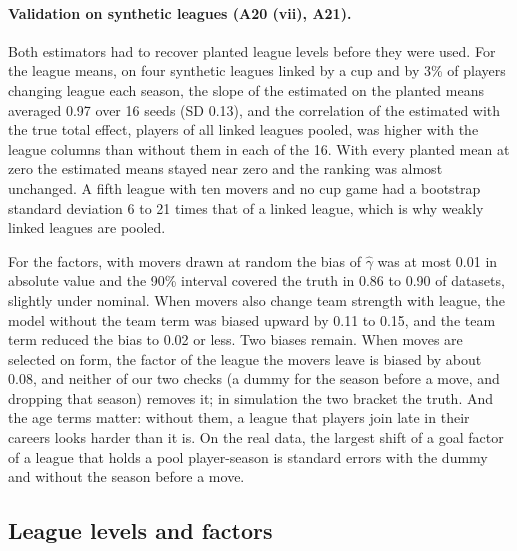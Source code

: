 \documentclass[11pt,a4paper]{article}
\begin{document}
\paragraph{Validation on synthetic leagues (A20 (vii), A21).}
Both estimators had to recover planted league levels before they were used.
For the league means, on four synthetic leagues linked by a cup and by 3\% of
players changing league each season, the slope of the estimated on the planted
means averaged 0.97 over 16 seeds (SD 0.13), and the correlation of the
estimated with the true total effect, players of all linked leagues pooled,
was higher with the league columns than without them in each of the 16. With
every planted mean at zero the estimated means stayed near zero and the
ranking was almost unchanged. A fifth league with ten movers and no cup game had a
bootstrap standard deviation 6 to 21 times that of a linked league, which is
why weakly linked leagues are pooled.

For the factors, with movers drawn at random the bias of $\hat\gamma$ was at
most 0.01 in absolute value and the 90\% interval covered the truth in 0.86 to
0.90 of datasets, slightly under nominal. When movers also change team
strength with league, the model without the team term was biased upward by
0.11 to 0.15, and the team term reduced the bias to 0.02 or less. Two biases
remain. When moves are selected on form, the factor of the league the movers
leave is biased by about 0.08, and neither of our two checks (a dummy for the
season before a move, and dropping that season) removes it; in simulation the
two bracket the truth. And the age terms matter: without them, a league that
players join late in their careers looks harder than it is. On the real data,
the largest shift of a goal factor of a league that holds a pool player-season
is \FactorShiftDummyMaxSe{} standard errors with the dummy and
\FactorShiftDroppedMaxSe{} without the season before a move.

\subsection{League levels and factors}
\label{sec:league-levels}
\end{document}
